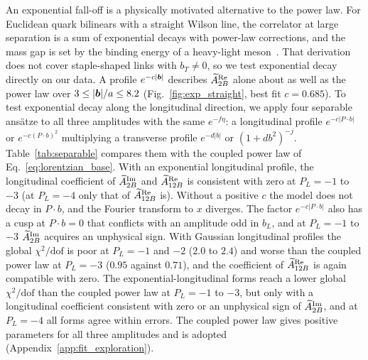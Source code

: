 An exponential fall-off is a physically motivated alternative to the power law. For Euclidean quark bilinears with a straight Wilson line, the correlator at large separation is a sum of exponential decays with power-law corrections, and the mass gap is set by the binding energy of a heavy-light meson~\cite{Ji:2026asym}. That derivation does not cover staple-shaped links with $b_T\neq0$, so we test exponential decay directly on our data. A profile $e^{-c|\boldsymbol{b}|}$ describes $\widetilde{A}_{2B}^{\text{Re}}$ alone about as well as the power law over $3\le|\boldsymbol{b}|/a\le8.2$ (Fig.~\ref{fig:exp_straight}, best fit $c=0.685$). To test exponential decay along the longitudinal direction, we apply four separable ansätze to all three amplitudes with the same $e^{-f\eta}$: a longitudinal profile $e^{-c|P\cdot b|}$ or $e^{-c(P\cdot b)^2}$ multiplying a transverse profile $e^{-d|b|}$ or $(1+db^2)^{-j}$. Table~\ref{tab:separable} compares them with the coupled power law of Eq.~\eqref{eq:lorentzian_base}. With an exponential longitudinal profile, the longitudinal coefficient of $\widetilde{A}_{2B}^{\text{Im}}$ and $\widetilde{A}_{12B}^{\text{Re}}$ is consistent with zero at $P_L=-1$ to $-3$ (at $P_L=-4$ only that of $\widetilde{A}_{12B}^{\text{Re}}$ is). Without a positive $c$ the model does not decay in $P\cdot b$, and the Fourier transform to $x$ diverges. The factor $e^{-c|P\cdot b|}$ also has a cusp at $P\cdot b=0$ that conflicts with an amplitude odd in $b_L$, and at $P_L=-1$ to $-3$ $\widetilde{A}_{2B}^{\text{Im}}$ acquires an unphysical sign. With Gaussian longitudinal profiles the global $\chi^2/\text{dof}$ is poor at $P_L=-1$ and $-2$ ($2.0$ to $2.4$) and worse than the coupled power law at $P_L=-3$ ($0.95$ against $0.71$), and the coefficient of $\widetilde{A}_{12B}^{\text{Re}}$ is again compatible with zero. The exponential-longitudinal forms reach a lower global $\chi^2/\text{dof}$ than the coupled power law at $P_L=-1$ to $-3$, but only with a longitudinal coefficient consistent with zero or an unphysical sign of $\widetilde{A}_{2B}^{\text{Im}}$, and at $P_L=-4$ all forms agree within errors. The coupled power law gives positive parameters for all three amplitudes and is adopted (Appendix~\ref{app:fit_exploration}).

